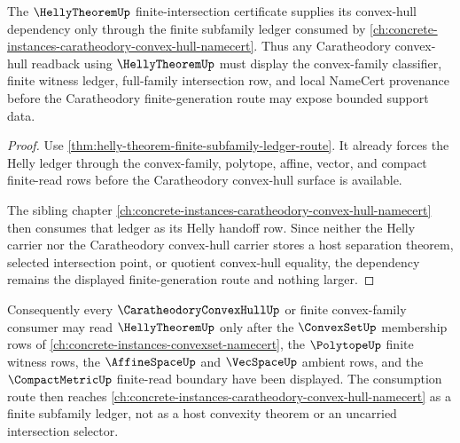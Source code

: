 \begin{proposition}
\label{prop:helly-theorem-convex-hull-sibling-dependency}
The $\HellyTheoremUp$ finite-intersection certificate supplies its convex-hull dependency only through the finite subfamily ledger consumed by \autoref{ch:concrete-instances-caratheodory-convex-hull-namecert}. Thus any Caratheodory convex-hull readback using $\HellyTheoremUp$ must display the convex-family classifier, finite witness ledger, full-family intersection row, and local NameCert provenance before the Caratheodory finite-generation route may expose bounded support data.
\end{proposition}
\begin{proof}
Use \autoref{thm:helly-theorem-finite-subfamily-ledger-route}. It already forces the Helly ledger through the convex-family, polytope, affine, vector, and compact finite-read rows before the Caratheodory convex-hull surface is available.

The sibling chapter \autoref{ch:concrete-instances-caratheodory-convex-hull-namecert} then consumes that ledger as its Helly handoff row. Since neither the Helly carrier nor the Caratheodory convex-hull carrier stores a host separation theorem, selected intersection point, or quotient convex-hull equality, the dependency remains the displayed finite-generation route and nothing larger.
\end{proof}

Consequently every $\CaratheodoryConvexHullUp$ or finite convex-family consumer may read $\HellyTheoremUp$ only after the $\ConvexSetUp$ membership rows of \autoref{ch:concrete-instances-convexset-namecert}, the $\PolytopeUp$ finite witness rows, the $\AffineSpaceUp$ and $\VecSpaceUp$ ambient rows, and the $\CompactMetricUp$ finite-read boundary have been displayed. The consumption route then reaches \autoref{ch:concrete-instances-caratheodory-convex-hull-namecert} as a finite subfamily ledger, not as a host convexity theorem or an uncarried intersection selector.
